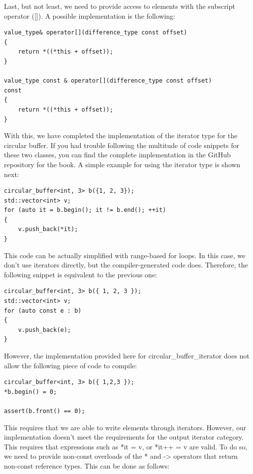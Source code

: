 Last, but not least, we need to provide access to elements with the subscript operator ([]). A possible implementation is the following: 

\begin{lstlisting}[style=styleCXX]
value_type& operator[](difference_type const offset)
{
	return *((*this + offset));
}

value_type const & operator[](difference_type const offset)
const
{
	return *((*this + offset));
}
\end{lstlisting}

With this, we have completed the implementation of the iterator type for the circular buffer. If you had trouble following the multitude of code snippets for these two classes, you can find the complete implementation in the GitHub repository for the book. A simple example for using the iterator type is shown next:

\begin{lstlisting}[style=styleCXX]
circular_buffer<int, 3> b({1, 2, 3});
std::vector<int> v;
for (auto it = b.begin(); it != b.end(); ++it)
{
	v.push_back(*it);
}
\end{lstlisting}

This code can be actually simplified with range-based for loops. In this case, we don’t use iterators directly, but the compiler-generated code does. Therefore, the following snippet is equivalent to the previous one:

\begin{lstlisting}[style=styleCXX]
circular_buffer<int, 3> b({ 1, 2, 3 });
std::vector<int> v;
for (auto const e : b)
{
	v.push_back(e);
}
\end{lstlisting}

However, the implementation provided here for circular\_buffer\_iterator does not allow the following piece of code to compile:

\begin{lstlisting}[style=styleCXX]
circular_buffer<int, 3> b({ 1,2,3 });
*b.begin() = 0;

assert(b.front() == 0);
\end{lstlisting}

This requires that we are able to write elements through iterators. However, our implementation doesn’t meet the requirements for the output iterator category. This requires that expressions such as *it = v, or *it++ = v are valid. To do so, we need to provide non-const overloads of the * and -> operators that return non-const reference types. This can be done as follows:

